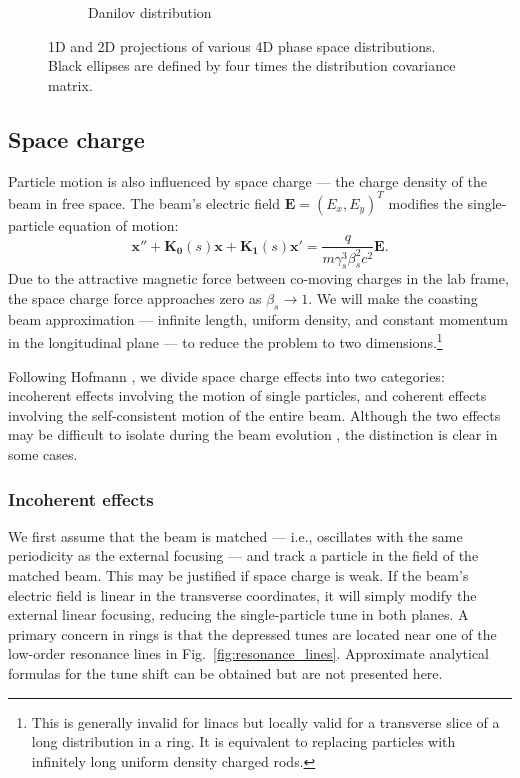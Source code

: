\begin{figure}[!p]
\begin{subfigure}{0.49\textwidth}
        \caption{Danilov distribution}
        \label{fig:distributions_danilov}
    \end{subfigure}
    \caption{1D and 2D projections of various 4D phase space distributions. Black ellipses are defined by four times the distribution covariance matrix.}
    \label{fig:distributions}
\end{figure}
%






\subsection{Space charge}\label{sec:Space charge}

Particle motion is also influenced by space charge — the charge density of the beam in free space. The beam's electric field $\mathbf{E} = (E_x, E_y)^T$ modifies the single-particle equation of motion:
%
\begin{equation}\label{eq:eom_with_spacecharge}
    \mathbf{x}'' + \mathbf{K_0}(s) \mathbf{x} + \mathbf{K_1}(s) \mathbf{x}' = \frac{q}{m\gamma_s^3\beta_s^2c^2} \mathbf{E}.
\end{equation}
% 
Due to the attractive magnetic force between co-moving charges in the lab frame, the space charge force approaches zero as $\beta_s \rightarrow 1$. We will make the coasting beam approximation — infinite length, uniform density, and constant momentum in the longitudinal plane — to reduce the problem to two dimensions.\footnote{This is generally invalid for linacs but locally valid for a transverse slice of a long distribution in a ring. It is equivalent to replacing particles with infinitely long uniform density charged rods.}

Following Hofmann \cite{Hofmann2017Book}, we divide space charge effects into two categories: incoherent effects involving the motion of single particles, and coherent effects involving the self-consistent motion of the entire beam. Although the two effects may be difficult to isolate during the beam evolution \cite{Hofmann2021}, the distinction is clear in some cases. 


\subsubsection{Incoherent effects}

We first assume that the beam is matched — i.e., oscillates with the same periodicity as the external focusing — and track a particle in the field of the matched beam. This may be justified if space charge is weak. If the beam's electric field is linear in the transverse coordinates, it will simply modify the external linear focusing, reducing the single-particle tune in both planes. A primary concern in rings is that the depressed tunes are located near one of the low-order resonance lines in Fig.~\ref{fig:resonance_lines}. Approximate analytical formulas for the tune shift can be obtained \cite{Ng2005} but are not presented here.

